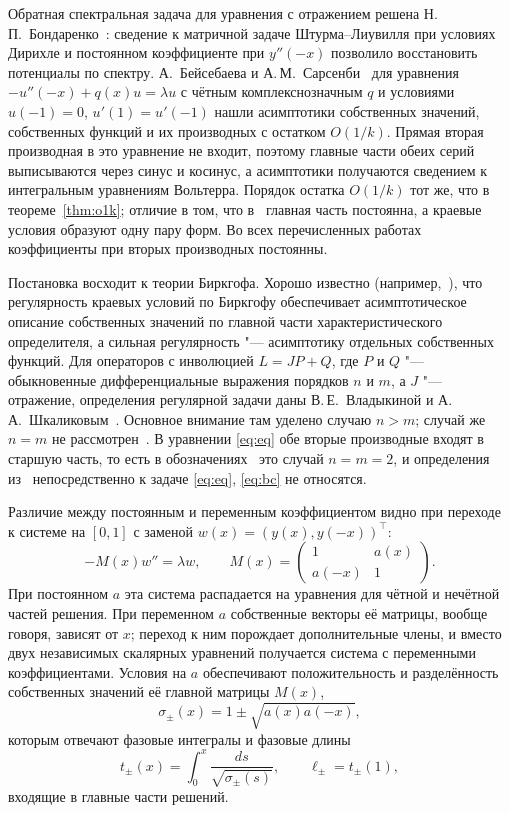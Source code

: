 \documentclass[12pt,a4paper]{article}
\numberwithin{equation}{section}
\theoremstyle{definition}
\begin{document}
Обратная спектральная задача для уравнения с отражением решена
Н.\,П.~Бондаренко~\cite{Bond}: сведение к матричной задаче Штурма--Лиувилля при условиях
Дирихле и постоянном коэффициенте при $y''(-x)$ позволило восстановить потенциалы по
спектру. А.~Бейсебаева и А.\,М.~Сарсенби~\cite{BeiSar} для уравнения
$-u''(-x)+q(x)u=\lambda u$ с чётным комплекснозначным $q$ и условиями $u(-1)=0$,
$u'(1)=u'(-1)$ нашли асимптотики собственных значений, собственных функций и их
производных с остатком $O(1/k)$. Прямая вторая производная в это уравнение не входит,
поэтому главные части обеих серий выписываются через синус и косинус, а асимптотики
получаются сведением к интегральным уравнениям Вольтерра. Порядок остатка $O(1/k)$ тот же,
что в теореме~\ref{thm:o1k}; отличие в том, что в~\cite{BeiSar} главная часть постоянна,
а краевые условия образуют одну пару форм. Во всех перечисленных работах коэффициенты при
вторых производных постоянны.

Постановка восходит к теории Биркгофа. Хорошо известно (например,~\cite{Na}),
что регулярность краевых условий по Биркгофу обеспечивает асимптотическое описание
собственных значений по главной части характеристического определителя, а сильная
регулярность "--- асимптотику отдельных собственных функций. Для операторов с инволюцией $L=JP+Q$,
где $P$ и $Q$ "--- обыкновенные дифференциальные выражения порядков $n$ и $m$, а $J$
"--- отражение, определения регулярной задачи даны В.\,Е.~Владыкиной и
А.\,А.~Шкаликовым~\cite{VS}. Основное внимание там уделено случаю $n>m$; случай же $n=m$
не рассмотрен~\cite[с.~644]{VS}. В уравнении \eqref{eq:eq} обе вторые производные входят в
старшую часть, то есть в обозначениях~\cite{VS} это случай $n=m=2$, и определения
из~\cite{VS} непосредственно к задаче \eqref{eq:eq}, \eqref{eq:bc} не относятся.

Различие между постоянным и переменным коэффициентом видно при переходе к системе
на $[0,1]$ с заменой $w(x)=(y(x),y(-x))^\top$:
\[
 -M(x)w''=\lambda w,\qquad M(x)=\begin{pmatrix}1&a(x)\\a(-x)&1\end{pmatrix}.
\]
При постоянном $a$ эта система распадается на уравнения для чётной и нечётной частей
решения. При переменном $a$ собственные векторы её матрицы, вообще говоря, зависят от $x$;
переход к ним порождает дополнительные члены, и вместо двух независимых скалярных
уравнений получается система с переменными коэффициентами. Условия на $a$ обеспечивают
положительность и разделённость собственных значений её главной матрицы $M(x)$,
\[
 \sigma_\pm(x)=1\pm\sqrt{a(x)a(-x)},
\]
которым отвечают фазовые интегралы и фазовые длины
\[
 t_\pm(x)=\int_0^x\frac{ds}{\sqrt{\sigma_\pm(s)}},\qquad \ell_\pm=t_\pm(1),
\]
входящие в главные части решений.
\end{document}
